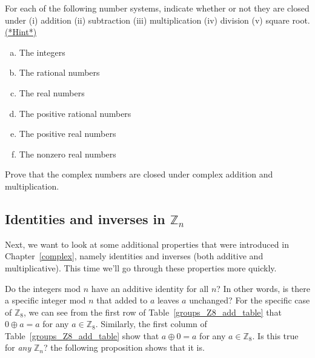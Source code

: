 \begin{exercise}{53}
For each of the following number systems, indicate whether or not they are closed under (i) addition (ii) subtraction (iii) multiplication (iv) division (v) square root.
\hyperref[sec:modular_arithmetic:hints]{(*Hint*)}  
\begin{multicols}{2}
\begin{enumerate}[(a)]
\item
The integers 
\item
The rational numbers
\item
The real numbers
\item
The positive rational numbers
\item
The positive real numbers
\item
The nonzero real numbers
\end{enumerate}
\end{multicols}
\end{exercise}

\begin{exercise}{54}
Prove that the complex numbers are closed under complex addition and multiplication.
\end{exercise}

\subsection{Identities and inverses in ${\mathbb Z}_n$}
Next, we want to look at some additional properties that were introduced in Chapter~\ref{complex}, namely 
 identities  and inverses (both additive and multiplicative).  
This time we'll go through these properties more quickly.

Do the integers mod $n$ have an additive identity for all $n$?  In other words, is there a specific integer mod $n$ that added to $a$ leaves $a$ unchanged? For the specific case of ${\mathbb Z}_8$, we can see from the first row of Table~\ref{groups_Z8_add_table} that 
$0 \oplus a = a $ for any $a \in {\mathbb Z}_8$. Similarly, the first column of Table~\ref{groups_Z8_add_table} show that $a \oplus 0 = a$ for any $a \in {\mathbb Z}_8$. Is this true for \emph{any} ${\mathbb Z}_n$? the following proposition shows that it is. 


